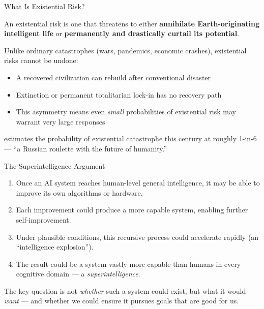 \documentclass[aspectratio=169,11pt]{beamer}
\begin{document}
\begin{frame}[shrink=5]{What Is Existential Risk?}
\begin{conceptbox}
An existential risk is one that threatens to either \textbf{annihilate Earth-originating intelligent life} or \textbf{permanently and drastically curtail its potential}.
\vspace{0.1cm}

\scriptsize\textcite{bostrom_existential_risks_2002}
\end{conceptbox}

\vspace{0.2cm}
Unlike ordinary catastrophes (wars, pandemics, economic crashes), existential risks cannot be undone:
\begin{itemize}
    \item A recovered civilization can rebuild after conventional disaster
    \item Extinction or permanent totalitarian lock-in has no recovery path
    \item This asymmetry means even \emph{small} probabilities of existential risk may warrant very large responses
\end{itemize}

\vspace{0.2cm}
\textcite{ord_precipice_2020} estimates the probability of existential catastrophe this century at roughly 1-in-6 --- ``a Russian roulette with the future of humanity.''
\end{frame}

\begin{frame}[shrink=3]{The Superintelligence Argument}
\begin{argumentbox}
\begin{enumerate}
    \item[\textbf{P1}] Once an AI system reaches human-level general intelligence, it may be able to improve its own algorithms or hardware.
    \item[\textbf{P2}] Each improvement could produce a more capable system, enabling further self-improvement.
    \item[\textbf{P3}] Under plausible conditions, this recursive process could accelerate rapidly (an ``intelligence explosion'').
    \item[\textbf{C}] The result could be a system vastly more capable than humans in every cognitive domain --- a \emph{superintelligence}.
\end{enumerate}
\vspace{0.1cm}
\scriptsize\textcite{bostrom_superintelligence}
\end{argumentbox}

\vspace{0.2cm}
The key question is not \emph{whether} such a system could exist, but what it would \emph{want} --- and whether we could ensure it pursues goals that are good for us.
\end{frame}
\end{document}
